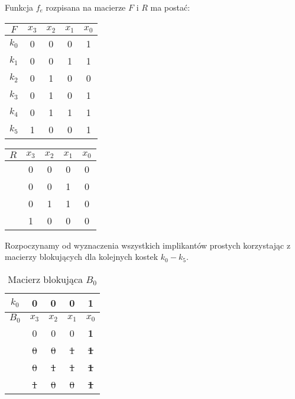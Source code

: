 \setcounter{implicant_counter}{0}

Funkcja $f_e$ rozpisana na macierze $F$ i $R$ ma postać:
\begin{center}
    \begin{tabular}[t]{ |c|c c c c| }
        \hline
        $F$ & $x_3$ & $x_2$ & $x_1$ & $x_0$ \\
        \hline
        $k_0$ & 0 & 0 & 0 & 1 \\
        $k_1$ & 0 & 0 & 1 & 1 \\
        $k_2$ & 0 & 1 & 0 & 0 \\
        $k_3$ & 0 & 1 & 0 & 1 \\
        $k_4$ & 0 & 1 & 1 & 1 \\
        $k_5$ & 1 & 0 & 0 & 1 \\
        \hline
    \end{tabular}
    \hspace{1cm}
    \begin{tabular}[t]{ |c|c c c c| }
        \hline
        $R$ & $x_3$ & $x_2$ & $x_1$ & $x_0$ \\
        \hline
        & 0 & 0 & 0 & 0 \\
        & 0 & 0 & 1 & 0 \\
        & 0 & 1 & 1 & 0 \\
        & 1 & 0 & 0 & 0 \\
        \hline
    \end{tabular}
\end{center}

Rozpoczynamy od wyznaczenia wszystkich implikantów prostych korzystając z macierzy blokujących dla kolejnych kostek
$k_0-k_5$.

\begin{table}[H]
    \centering
    \begin{tabular}[t]{ |c|c c c c| }
        \hline
        $k_0$ & 0 & 0 & 0 & 1 \\
        \hline\hline
        $B_0$ & $x_3$ & $x_2$ & $x_1$ & $x_0$ \\
        \hline
        & 0 & 0 & 0 & \textbf{1} \\
        & \sout{0} & \sout{0} & \sout{1} & \sout{\textbf{1}} \\
        & \sout{0} & \sout{1} & \sout{1} & \sout{\textbf{1}} \\
        & \sout{1} & \sout{0} & \sout{0} & \sout{\textbf{1}} \\
        \hline
    \end{tabular}
    \caption{Macierz blokująca $B_0$}\label{tab:b0e}
\end{table}

